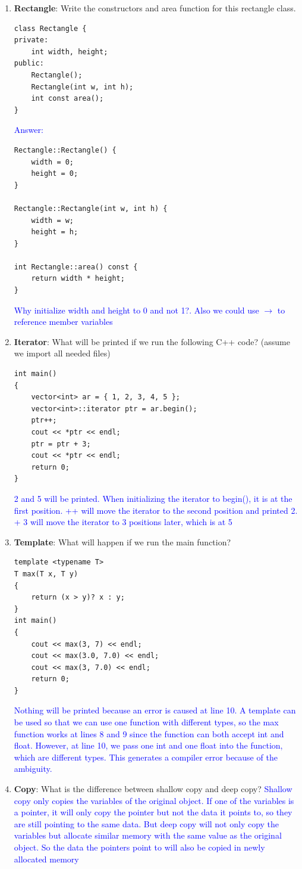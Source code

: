 \documentclass{article}
\begin{document}
\begin{enumerate}[label=(\alph*)]
    \item \textbf{Rectangle}: Write the constructors and area function for this rectangle class.
    \begin{lstlisting}[style=CStyle]
class Rectangle {
private:
    int width, height;
public:
    Rectangle();
    Rectangle(int w, int h);
    int const area();
}
\end{lstlisting}
\textcolor{blue}{Answer:}
\begin{lstlisting}[style=CStyle]
Rectangle::Rectangle() {
    width = 0;
    height = 0;
}

Rectangle::Rectangle(int w, int h) {
    width = w;
    height = h;
}

int Rectangle::area() const {
    return width * height;
}\end{lstlisting}

\textcolor{blue}{Why initialize width and height to 0 and not 1?. Also  we could use $\rightarrow{}$ to reference member variables}
    \item \textbf{Iterator}: What will be printed if we run the following C++ code? (assume we import all needed files)
    \begin{lstlisting}[style=CStyle]
    int main() 
{ 
    vector<int> ar = { 1, 2, 3, 4, 5 }; 
    vector<int>::iterator ptr = ar.begin(); 
    ptr++;
    cout << *ptr << endl; 
    ptr = ptr + 3;
    cout << *ptr << endl; 
    return 0; 
}
\end{lstlisting}
\textcolor{blue}{2 and 5 will be printed. When initializing the iterator to begin(), it is at the first position. ++ will move the iterator to the second position and printed 2. + 3 will move the iterator to 3 positions later, which is at 5}
    \item \textbf{Template}: What will happen if we run the main function?
    \begin{lstlisting}[style=CStyle]
template <typename T>
T max(T x, T y)
{
    return (x > y)? x : y;
}
int main()
{
    cout << max(3, 7) << endl;
    cout << max(3.0, 7.0) << endl;
    cout << max(3, 7.0) << endl;
    return 0;
}
\end{lstlisting}
\textcolor{blue}{Nothing will be printed because an error is caused at line 10. A template can be used so that we can use one function with different types, so the max function works at lines 8 and 9 since the function can both accept int and float. However, at line 10, we pass one int and one float into the function, which are different types. This generates a compiler error because of the ambiguity.}
    \item \textbf{Copy}: What is the difference between shallow copy and deep copy?
\newline\textcolor{blue}{Shallow copy only copies the variables of the original object. If one of the variables is a pointer, it will only copy the pointer but not the data it points to, so they are still pointing to the same data. But deep copy will not only copy the variables but allocate similar memory with the same value as the original object. So the data the pointers point to will also be copied in newly allocated memory}


\end{enumerate}
\end{document}
